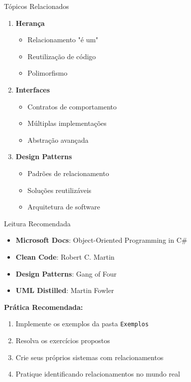 \documentclass[aspectratio=169]{beamer}
\begin{document}
\begin{frame}{Tópicos Relacionados}
\begin{enumerate}
\item \textbf{Herança}
\begin{itemize}
\item Relacionamento "é um"
\item Reutilização de código
\item Polimorfismo
\end{itemize}

\item \textbf{Interfaces}
\begin{itemize}
\item Contratos de comportamento
\item Múltiplas implementações
\item Abstração avançada
\end{itemize}

\item \textbf{Design Patterns}
\begin{itemize}
\item Padrões de relacionamento
\item Soluções reutilizáveis
\item Arquitetura de software
\end{itemize}
\end{enumerate}
\end{frame}

\begin{frame}{Leitura Recomendada}
\begin{itemize}
\item \textbf{Microsoft Docs}: Object-Oriented Programming in C\#
\item \textbf{Clean Code}: Robert C. Martin
\item \textbf{Design Patterns}: Gang of Four
\item \textbf{UML Distilled}: Martin Fowler
\end{itemize}

\vspace{0.5cm}
\textbf{Prática Recomendada:}
\begin{enumerate}
\item Implemente os exemplos da pasta \texttt{Exemplos}
\item Resolva os exercícios propostos
\item Crie seus próprios sistemas com relacionamentos
\item Pratique identificando relacionamentos no mundo real
\end{enumerate}
\end{frame}
\end{document}
